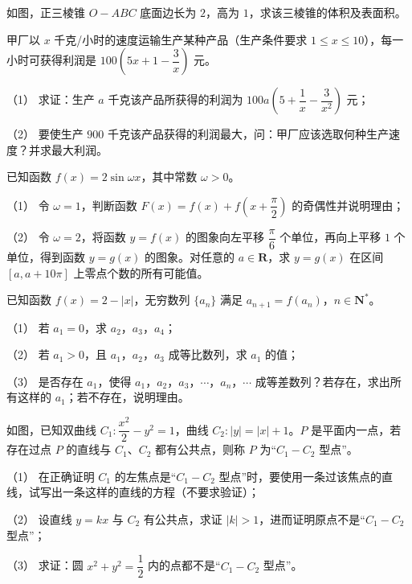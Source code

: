 \Needspace{0.4\textheight}
\begin{question}
如图，正三棱锥 $O-ABC$ 底面边长为 $2$，高为 $1$，求该三棱锥的体积及表面积。
\nopagebreak[4]
\begin{center}\end{center}
\nopagebreak[4]
\end{question}
\begin{question}
甲厂以 $x$ 千克/小时的速度运输生产某种产品（生产条件要求 $1\leqslant x\leqslant 10$），每一小时可获得利润是 $100\left(5x+1-\dfrac3x\right)$ 元。

（1） 求证：生产 $a$ 千克该产品所获得的利润为 $100a\left(5+\dfrac1x-\dfrac{3}{x^2}\right)$ 元；

（2） 要使生产 $900$ 千克该产品获得的利润最大，问：甲厂应该选取何种生产速度？并求最大利润。

\end{question}
\begin{question}
已知函数 $f(x)=2\sin\omega x$，其中常数 $\omega>0$。

（1） 令 $\omega=1$，判断函数 $F(x)=f(x)+f\left(x+\dfrac{\pi}{2}\right)$ 的奇偶性并说明理由；

（2） 令 $\omega=2$，将函数 $y=f(x)$ 的图象向左平移 $\dfrac{\pi}{6}$ 个单位，再向上平移 $1$ 个单位，得到函数 $y=g(x)$ 的图象。对任意的 $a\in\mathbf R$，求 $y=g(x)$ 在区间 $[a,a+10\pi]$ 上零点个数的所有可能值。

\end{question}
\begin{question}
已知函数 $f(x)=2-|x|$，无穷数列 $\{a_n\}$ 满足 $a_{n+1}=f(a_n)$，$n\in\mathbf N^*$。

（1） 若 $a_1=0$，求 $a_2$，$a_3$，$a_4$；

（2） 若 $a_1>0$，且 $a_1$，$a_2$，$a_3$ 成等比数列，求 $a_1$ 的值；

（3） 是否存在 $a_1$，使得 $a_1$，$a_2$，$a_3$，$\cdots$，$a_n$，$\cdots$ 成等差数列？若存在，求出所有这样的 $a_1$；若不存在，说明理由。

\Needspace{0.4\textheight}
\end{question}
\begin{question}
如图，已知双曲线 $C_1:\dfrac{x^2}{2}-y^2=1$，曲线 $C_2:|y|=|x|+1$。$P$ 是平面内一点，若存在过点 $P$ 的直线与 $C_1$、$C_2$ 都有公共点，则称 $P$ 为“$C_1-C_2$ 型点”。
\nopagebreak[4]
\begin{center}\end{center}
\nopagebreak[4]
（1） 在正确证明 $C_1$ 的左焦点是“$C_1-C_2$ 型点”时，要使用一条过该焦点的直线，试写出一条这样的直线的方程（不要求验证）；

（2） 设直线 $y=kx$ 与 $C_2$ 有公共点，求证 $|k|>1$，进而证明原点不是“$C_1-C_2$ 型点”；

（3） 求证：圆 $x^2+y^2=\dfrac12$ 内的点都不是“$C_1-C_2$ 型点”。

\end{question}